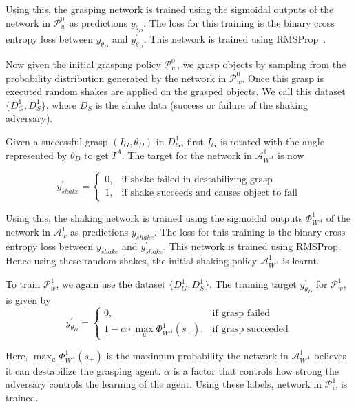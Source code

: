 \documentclass[letterpaper, 10 pt, conference]{ieeeconf}  %
\begin{document}
Using this, the grasping network is trained using the sigmoidal outputs of the network in $\mathcal{P}^{0}_{w}$ as predictions $y_{\theta_D}$. The loss for this training is the binary cross entropy loss between $y_{\theta_D}$ and $y^{\prime}_{\theta_D}$. This network is trained using RMSProp~\cite{tieleman2012lecture}.



Now given the initial grasping policy $\mathcal{P}^{0}_{w}$, we grasp objects by sampling from the probability distribution generated by the network in $\mathcal{P}^{0}_{w}$. Once this grasp is executed random shakes are applied on the grasped objects. We call this dataset $\{D^1_G,D^1_S\}$, where $D_S$ is the shake data (success or failure of the shaking adversary). 

Given a successful grasp $(I_G,\theta_D)$ in $D^1_G$, first $I_G$ is rotated with the angle represented by $\theta_D$ to get $I^A$. The target for the network in $\mathcal{A}^{1}_{W^A}$ is now

\begin{equation}
    y^{\prime}_{shake}= 
\begin{cases}
    0,& \text{if shake failed in destabilizing grasp}\\
    1,& \text{if shake succeeds and causes object to fall}
\end{cases}
\end{equation}

Using this, the shaking network is trained using the sigmoidal outputs $\Phi^{1}_{W^A}$ of the network in $\mathcal{A}^{1}_{w}$ as predictions $y_{shake}$. The loss for this training is the binary cross entropy loss between $y_{shake}$ and $y^{\prime}_{shake}$. This network is trained using RMSProp. Hence using these random shakes, the initial shaking policy $\mathcal{A}^{1}_{W^A}$ is learnt. 


To train $\mathcal{P}^{1}_{w}$, we again use the dataset $\{D^1_G,D^1_S\}$. The training target $y^{\prime}_{\theta_D}$ for $\mathcal{P}^{1}_{w}$, is given by 
\begin{equation}
    y^{\prime}_{\theta_D}= 
\begin{cases}
    0,& \text{if grasp failed}\\
    1 - \alpha\cdot\max_{u}{\Phi^{1}_{W^A}(s_+)},              & \text{if grasp succeeded}
    
\end{cases}
\end{equation}

Here, $\max_{u}{\Phi^{1}_{W^A}(s_+)}$ is the maximum probability the network in $\mathcal{A}^{1}_{W^A}$ believes it can destabilize the grasping agent. $\alpha$ is a factor that controls how strong the adversary controls the learning of the agent. Using these labels, network in $\mathcal{P}^{1}_{w}$ is trained.
\end{document}
